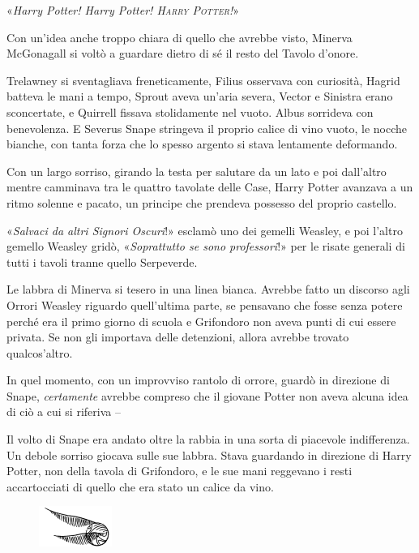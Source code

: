 «\textit{Harry Potter! Harry Potter! \textsc{Harry Potter!}}»

Con un’idea anche troppo chiara di quello che avrebbe visto, Minerva McGonagall si voltò a guardare dietro di sé il resto del Tavolo d’onore.

Trelawney si sventagliava freneticamente, Filius osservava con curiosità, Hagrid batteva le mani a tempo, Sprout aveva un’aria severa, Vector e Sinistra erano sconcertate, e Quirrell fissava stolidamente nel vuoto. Albus sorrideva con benevolenza. E Severus Snape stringeva il proprio calice di vino vuoto, le nocche bianche, con tanta forza che lo spesso argento si stava lentamente deformando.

Con un largo sorriso, girando la testa per salutare da un lato e poi dall’altro mentre camminava tra le quattro tavolate delle Case, Harry Potter avanzava a un ritmo solenne e pacato, un principe che prendeva possesso del proprio castello.

«\textit{Salvaci da altri Signori Oscuri}!» esclamò uno dei gemelli Weasley, e poi l’altro gemello Weasley gridò, «\textit{Soprattutto se sono professori}!» per le risate generali di tutti i tavoli tranne quello Serpeverde.

Le labbra di Minerva si tesero in una linea bianca. Avrebbe fatto un discorso agli Orrori Weasley riguardo quell’ultima parte, se pensavano che fosse senza potere perché era il primo giorno di scuola e Grifondoro non aveva punti di cui essere privata. Se non gli importava delle detenzioni, allora avrebbe trovato qualcos’altro.

In quel momento, con un improvviso rantolo di orrore, guardò in direzione di Snape, \textit{certamente} avrebbe compreso che il giovane Potter non aveva alcuna idea di ciò a cui si riferiva –

Il volto di Snape era andato oltre la rabbia in una sorta di piacevole indifferenza. Un debole sorriso giocava sulle sue labbra. Stava guardando in direzione di Harry Potter, non della tavola di Grifondoro, e le sue mani reggevano i resti accartocciati di quello che era stato un calice da vino.

\begin{figure}[h!]
        \includegraphics[scale=0.4]{boccino.png}
        \centering
\end{figure}

